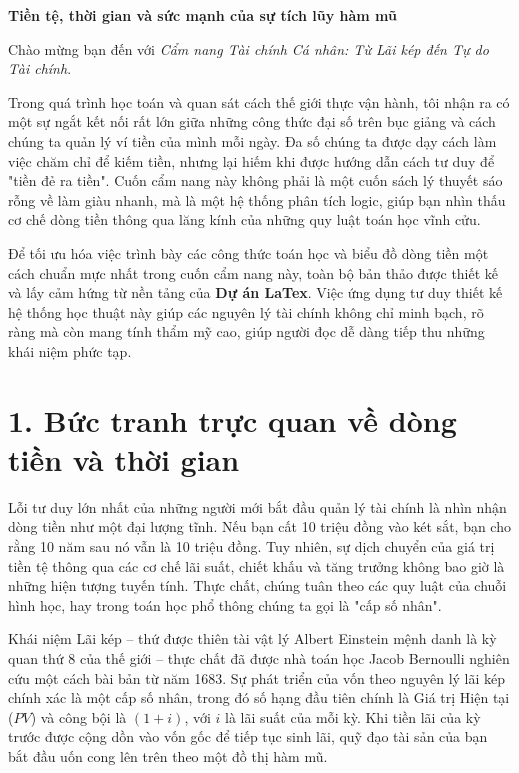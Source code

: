 \documentclass[14pt, a4paper, oneside]{extreport}
\begin{document}
\textbf{Tiền tệ, thời gian và sức mạnh của sự tích lũy hàm mũ}

Chào mừng bạn đến với \textit{Cẩm nang Tài chính Cá nhân: Từ Lãi kép đến Tự do Tài chính}. 

Trong quá trình học toán và quan sát cách thế giới thực vận hành, tôi nhận ra có một sự ngắt kết nối rất lớn giữa những công thức đại số trên bục giảng và cách chúng ta quản lý ví tiền của mình mỗi ngày. Đa số chúng ta được dạy cách làm việc chăm chỉ để kiếm tiền, nhưng lại hiếm khi được hướng dẫn cách tư duy để "tiền đẻ ra tiền". Cuốn cẩm nang này không phải là một cuốn sách lý thuyết sáo rỗng về làm giàu nhanh, mà là một hệ thống phân tích logic, giúp bạn nhìn thấu cơ chế dòng tiền thông qua lăng kính của những quy luật toán học vĩnh cửu.

Để tối ưu hóa việc trình bày các công thức toán học và biểu đồ dòng tiền một cách chuẩn mực nhất trong cuốn cẩm nang này, toàn bộ bản thảo được thiết kế và lấy cảm hứng từ nền tảng của \textbf{Dự án LaTex}. Việc ứng dụng tư duy thiết kế hệ thống học thuật này giúp các nguyên lý tài chính không chỉ minh bạch, rõ ràng mà còn mang tính thẩm mỹ cao, giúp người đọc dễ dàng tiếp thu những khái niệm phức tạp.

\section*{1. Bức tranh trực quan về dòng tiền và thời gian}

Lỗi tư duy lớn nhất của những người mới bắt đầu quản lý tài chính là nhìn nhận dòng tiền như một đại lượng tĩnh. Nếu bạn cất 10 triệu đồng vào két sắt, bạn cho rằng 10 năm sau nó vẫn là 10 triệu đồng. Tuy nhiên, sự dịch chuyển của giá trị tiền tệ thông qua các cơ chế lãi suất, chiết khấu và tăng trưởng không bao giờ là những hiện tượng tuyến tính. Thực chất, chúng tuân theo các quy luật của chuỗi hình học, hay trong toán học phổ thông chúng ta gọi là "cấp số nhân".

Khái niệm Lãi kép – thứ được thiên tài vật lý Albert Einstein mệnh danh là kỳ quan thứ 8 của thế giới – thực chất đã được nhà toán học Jacob Bernoulli nghiên cứu một cách bài bản từ năm 1683. Sự phát triển của vốn theo nguyên lý lãi kép chính xác là một cấp số nhân, trong đó số hạng đầu tiên chính là Giá trị Hiện tại ($PV$) và công bội là $(1 + i)$, với $i$ là lãi suất của mỗi kỳ. Khi tiền lãi của kỳ trước được cộng dồn vào vốn gốc để tiếp tục sinh lãi, quỹ đạo tài sản của bạn bắt đầu uốn cong lên trên theo một đồ thị hàm mũ.
\end{document}
